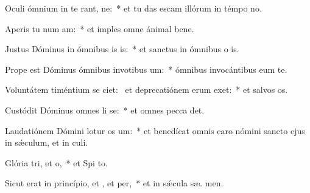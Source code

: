 \item Oculi ómnium in te rant, ne:~* et tu das escam illórum in témpo no.
\item Aperis tu num am:~* et imples omne ánimal bene.
\item Justus Dóminus in ómnibus is is:~* et sanctus in ómnibus o is.
\item Prope est Dóminus ómnibus invotibus um:~* ómnibus invocántibus eum  te.
\item Voluntátem timéntium se ciet:~\pscross{} et deprecatiónem erum exet:~* et salvos  os.
\item Custódit Dóminus omnes li se:~* et omnes pecca det.
\item Laudatiónem Dómini lotur os um:~* et benedícat omnis caro nómini sancto ejus in sǽculum, et in  culi.
\item Glória tri, et o,~* et Spi to.
\item Sicut erat in princípio, et , et per,~* et in sǽcula sæ. men.
